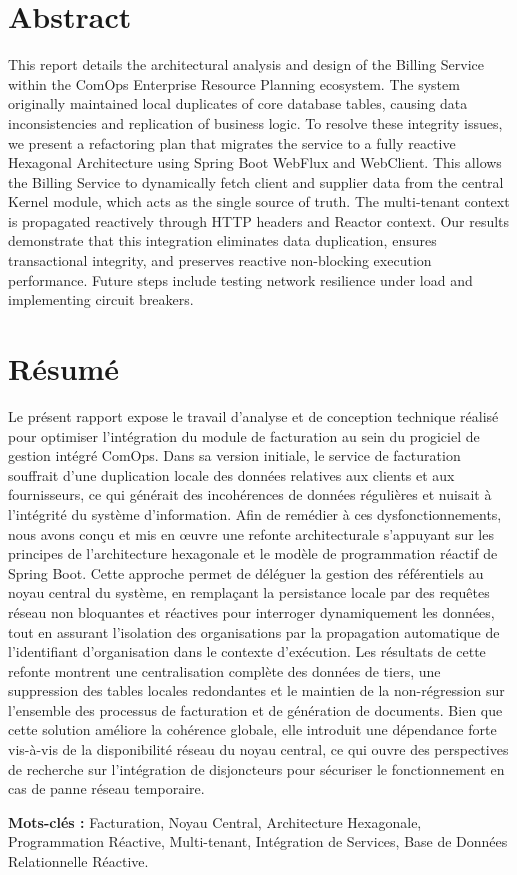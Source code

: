 \chapter*{Abstract}
This report details the architectural analysis and design of the Billing Service within the ComOps Enterprise Resource Planning ecosystem. The system originally maintained local duplicates of core database tables, causing data inconsistencies and replication of business logic. To resolve these integrity issues, we present a refactoring plan that migrates the service to a fully reactive Hexagonal Architecture using Spring Boot WebFlux and WebClient. This allows the Billing Service to dynamically fetch client and supplier data from the central Kernel module, which acts as the single source of truth. The multi-tenant context is propagated reactively through HTTP headers and Reactor context. Our results demonstrate that this integration eliminates data duplication, ensures transactional integrity, and preserves reactive non-blocking execution performance. Future steps include testing network resilience under load and implementing circuit breakers.

\chapter*{Résumé}
Le présent rapport expose le travail d'analyse et de conception technique réalisé pour optimiser l'intégration du module de facturation au sein du progiciel de gestion intégré ComOps. Dans sa version initiale, le service de facturation souffrait d'une duplication locale des données relatives aux clients et aux fournisseurs, ce qui générait des incohérences de données régulières et nuisait à l'intégrité du système d'information. Afin de remédier à ces dysfonctionnements, nous avons conçu et mis en œuvre une refonte architecturale s'appuyant sur les principes de l'architecture hexagonale et le modèle de programmation réactif de Spring Boot. Cette approche permet de déléguer la gestion des référentiels au noyau central du système, en remplaçant la persistance locale par des requêtes réseau non bloquantes et réactives pour interroger dynamiquement les données, tout en assurant l'isolation des organisations par la propagation automatique de l'identifiant d'organisation dans le contexte d'exécution. Les résultats de cette refonte montrent une centralisation complète des données de tiers, une suppression des tables locales redondantes et le maintien de la non-régression sur l'ensemble des processus de facturation et de génération de documents. Bien que cette solution améliore la cohérence globale, elle introduit une dépendance forte vis-à-vis de la disponibilité réseau du noyau central, ce qui ouvre des perspectives de recherche sur l'intégration de disjoncteurs pour sécuriser le fonctionnement en cas de panne réseau temporaire.

\vspace{1cm}
\noindent \textbf{Mots-clés :} Facturation, Noyau Central, Architecture Hexagonale, Programmation Réactive, Multi-tenant, Intégration de Services, Base de Données Relationnelle Réactive.

